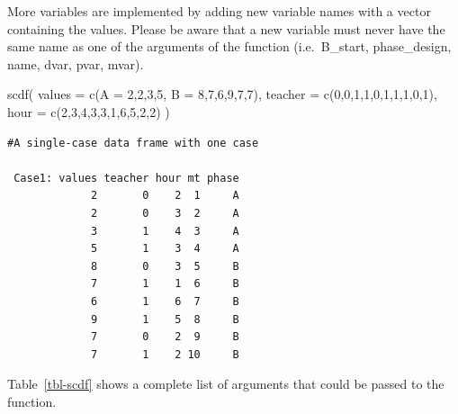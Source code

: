 \documentclass[
  letterpaper,
  DIV=11,
  numbers=noendperiod]{scrreprt}
\newenvironment{Shaded}{\begin{snugshade}}{\end{snugshade}}
\newcommand{\AttributeTok}[1]{\textcolor[rgb]{0.40,0.45,0.13}{#1}}
\newcommand{\DecValTok}[1]{\textcolor[rgb]{0.68,0.00,0.00}{#1}}
\newcommand{\FunctionTok}[1]{\textcolor[rgb]{0.28,0.35,0.67}{#1}}
\newcommand{\NormalTok}[1]{\textcolor[rgb]{0.00,0.23,0.31}{#1}}
\begin{document}
More variables are implemented by adding new variable names with a
vector containing the values. Please be aware that a new variable must
never have the same name as one of the arguments of the function
(i.e.~B\_start, phase\_design, name, dvar, pvar, mvar).

\begin{Shaded}
\begin{Highlighting}[]
\FunctionTok{scdf}\NormalTok{(}
  \AttributeTok{values =} \FunctionTok{c}\NormalTok{(}\AttributeTok{A =} \DecValTok{2}\NormalTok{,}\DecValTok{2}\NormalTok{,}\DecValTok{3}\NormalTok{,}\DecValTok{5}\NormalTok{, }\AttributeTok{B =} \DecValTok{8}\NormalTok{,}\DecValTok{7}\NormalTok{,}\DecValTok{6}\NormalTok{,}\DecValTok{9}\NormalTok{,}\DecValTok{7}\NormalTok{,}\DecValTok{7}\NormalTok{), }
  \AttributeTok{teacher =} \FunctionTok{c}\NormalTok{(}\DecValTok{0}\NormalTok{,}\DecValTok{0}\NormalTok{,}\DecValTok{1}\NormalTok{,}\DecValTok{1}\NormalTok{,}\DecValTok{0}\NormalTok{,}\DecValTok{1}\NormalTok{,}\DecValTok{1}\NormalTok{,}\DecValTok{1}\NormalTok{,}\DecValTok{0}\NormalTok{,}\DecValTok{1}\NormalTok{), }
  \AttributeTok{hour =} \FunctionTok{c}\NormalTok{(}\DecValTok{2}\NormalTok{,}\DecValTok{3}\NormalTok{,}\DecValTok{4}\NormalTok{,}\DecValTok{3}\NormalTok{,}\DecValTok{3}\NormalTok{,}\DecValTok{1}\NormalTok{,}\DecValTok{6}\NormalTok{,}\DecValTok{5}\NormalTok{,}\DecValTok{2}\NormalTok{,}\DecValTok{2}\NormalTok{)}
\NormalTok{)}
\end{Highlighting}
\end{Shaded}

\begin{verbatim}
#A single-case data frame with one case

 Case1: values teacher hour mt phase
             2       0    2  1     A
             2       0    3  2     A
             3       1    4  3     A
             5       1    3  4     A
             8       0    3  5     B
             7       1    1  6     B
             6       1    6  7     B
             9       1    5  8     B
             7       0    2  9     B
             7       1    2 10     B
\end{verbatim}

Table~\ref{tbl-scdf} shows a complete list of arguments that could be
passed to the function.
\end{document}
